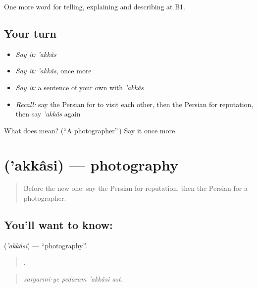\begin{grammarlens}[title={What you've built}]
One more word for telling, explaining and describing at B1.
\end{grammarlens}

\subsection*{Your turn}
\begin{itemize}
\raggedright
  \item \emph{Say it:} \emph{'akkâs}
  \item \emph{Say it:} \emph{'akkâs}, once more
  \item \emph{Say it:} a sentence of your own with \emph{'akkâs}
  \item \emph{Recall:} say the Persian for to visit each other, then the Persian for reputation, then say \emph{'akkâs} again
\end{itemize}

\begin{tcolorbox}[breakable,colback=teal!4,colframe=teal!35!black,title={Before you move on}]
What does  mean? (\textquotedblleft{}A photographer\textquotedblright{}.) Say it once more.
\end{tcolorbox}
\section[\texorpdfstring{\fa{عکاسی} ('akkâsi)}{عکاسی ('akkâsi)}]{ ('akkâsi) — photography}

\label{lesson:FA-C507-akkasi}



\begin{quote}
Before the new one: say the Persian for reputation, then the Persian for a photographer.
\end{quote}

\subsection*{You'll want to know: }
\textbf{} (\emph{'akkâsi}) — \textquotedblleft{}photography\textquotedblright{}.

\begin{quote}
   .
\end{quote}

\begin{quote}
\emph{sargarmi-ye pedaram 'akkâsi ast.}
\end{quote}

